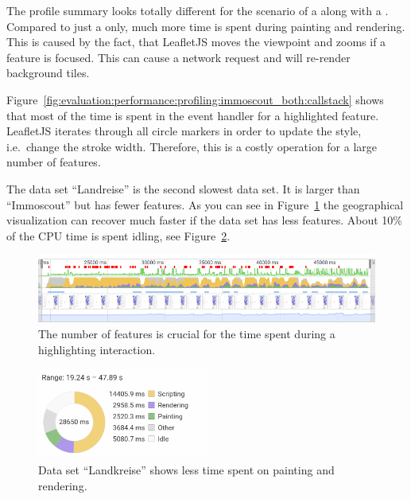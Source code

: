 The profile summary looks totally different for the scenario of a \tmap{} along with a \gvis{}.
Compared to just a \tmap{} only, much more time is spent during painting and rendering.
This is caused by the fact, that LeafletJS moves the viewpoint and zooms if a feature is focused.
This can cause a network request and will re-render background tiles.

Figure~\ref{fig:evaluation:performance:profiling:immoscout_both:callstack} shows that most of the time is spent in the event handler for a highlighted feature.
LeafletJS iterates through all circle markers in order to update the style, i.e.\ change the stroke width.
Therefore, this is a costly operation for a large number of features.

The data set ``Landreise'' is the second slowest data set.
It is larger than ``Immoscout'' but has fewer features.
As you can see in Figure~\ref{fig:evaluation:performance:profiling:landkreise_both:fps} the geographical visualization can recover much faster if the data set has less features.
About 10\% of the CPU time is spent idling, see Figure~\ref{fig:evaluation:performance:profiling:landkreise_both:summary}.

\begin{figure}[h]
  \centering
  \includegraphics[width=\textwidth]{figures/evaluation/performance/profiles/landkreise_both/fps}
  \caption{
    The number of features is crucial for the time spent during a highlighting interaction.
  }\label{fig:evaluation:performance:profiling:landkreise_both:fps}
\end{figure}

\begin{figure}[h]
  \centering
  \includegraphics[width=0.5\textwidth]{figures/evaluation/performance/profiles/landkreise_both/summary}
  \caption{
    Data set ``Landkreise'' shows less time spent on painting and rendering.
  }\label{fig:evaluation:performance:profiling:landkreise_both:summary}
\end{figure}

